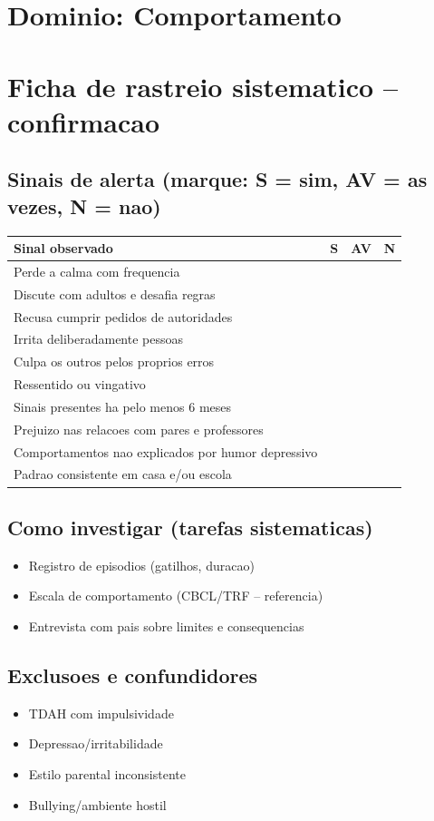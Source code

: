 \documentclass[a4paper,11pt]{book}
\begin{document}
\section*{Dominio: Comportamento}
\section*{Ficha de rastreio sistematico -- confirmacao}
\subsection*{Sinais de alerta (marque: S = sim, AV = as vezes, N = nao)}
\begin{tabular}{@{}p{11.5cm}ccc@{}}\toprule
Sinal observado & S & AV & N \\\midrule
Perde a calma com frequencia & & & \\
Discute com adultos e desafia regras & & & \\
Recusa cumprir pedidos de autoridades & & & \\
Irrita deliberadamente pessoas & & & \\
Culpa os outros pelos proprios erros & & & \\
Ressentido ou vingativo & & & \\
Sinais presentes ha pelo menos 6 meses & & & \\
Prejuizo nas relacoes com pares e professores & & & \\
Comportamentos nao explicados por humor depressivo & & & \\
Padrao consistente em casa e/ou escola & & & \\
\bottomrule\end{tabular}
\subsection*{Como investigar (tarefas sistematicas)}
\begin{itemize}
\item Registro de episodios (gatilhos, duracao)
\item Escala de comportamento (CBCL/TRF -- referencia)
\item Entrevista com pais sobre limites e consequencias
\end{itemize}
\subsection*{Exclusoes e confundidores}
\begin{itemize}
\item TDAH com impulsividade
\item Depressao/irritabilidade
\item Estilo parental inconsistente
\item Bullying/ambiente hostil
\end{itemize}
\end{document}
